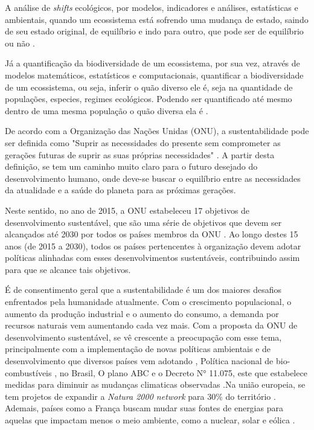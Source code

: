 \documentclass{article}[12pt]
\begin{document}
A análise de \textit{shifts} ecológicos, por modelos, indicadores e análises, estatísticas e
ambientais, quando um ecossistema está sofrendo uma mudança de estado, saindo de seu estado
original, de equilíbrio e indo para outro, que pode ser de equilíbrio ou não \cite{Clare2017}. \par

Já a quantificação da biodiversidade de um ecossistema, por sua vez, através de modelos matemáticos,
estatísticos e computacionais, quantificar a biodiversidade de um ecossistema, ou seja, inferir o
quão diverso ele é,  seja na quantidade de populações, especies, regimes ecológicos. Podendo ser
quantificado até mesmo dentro de uma mesma população o quão diversa ela é \cite{Sherwin2019}. \par

De acordo com a Organização das Nações Unidas (ONU), a sustentabilidade pode ser definida como
"Suprir as necessidades do presente sem comprometer as gerações futuras de suprir as suas próprias
necessidades" \cite{onenvironment1987common}. A partir desta definição, se tem um caminho muito
claro para o futuro desejado do desenvolvimento humano, onde deve-se buscar o equilíbrio entre as
necessidades da atualidade e a saúde do planeta para as próximas gerações. 

\par
Neste sentido, no ano de 2015, a ONU estabeleceu 17 objetivos de desenvolvimento sustentável, que
são uma série de objetivos que devem ser alcançados até 2030 por todos os países membros da ONU
\cite{Agenda2023}. Ao longo destes 15 anos (de 2015 a 2030), todos os países pertencentes à
organização devem adotar políticas alinhadas com esses desenvolvimentos sustentáveis, contribuindo
assim para que se alcance tais objetivos. \par


É de consentimento geral que a sustentabilidade é um dos maiores desafios enfrentados pela
humanidade atualmente. Com o crescimento populacional, o aumento da produção industrial e o aumento
do consumo, a demanda por recursos naturais vem aumentando cada vez mais. Com a proposta da ONU de
desenvolvimento sustentável, se vê crescente a preocupação com esse tema, principalmente com a
implementação de novas políticas ambientais e de desenvolvimento que diversos países vem adotando
\cite{SDG2022},
Política nacional de bio-combustíveis \cite{RenovaBio2017}, no Brasil, O plano ABC
\cite{PlanoABC_2016} e o Decreto N° 11.075, este que estabelece medidas para diminuir as mudanças
climaticas observadas \cite{Decreto11075}.Na união europeia, se tem projetos de expandir a
\textit{Natura 2000 network} para 30\% do território \cite{Mller2020}.  Ademais, países como a
França buscam mudar suas fontes de energias para aquelas que impactam menos o meio ambiente, como a
nuclear, solar e eólica \cite{Lebrouhi2022}.
\par
\end{document}
